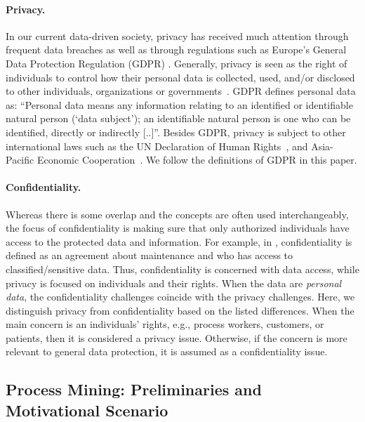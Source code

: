 \documentclass[manuscript]{acmart}
\begin{document}
\paragraph{Privacy.} In our current data-driven society, privacy has received much attention through frequent data breaches as well as through regulations such as Europe's General Data Protection Regulation (GDPR) \cite{GDPR}. Generally, privacy is seen as the right of individuals to control how their personal data is collected, used, and/or disclosed to other individuals, organizations or governments~\cite{westin1968privacy}.
GDPR defines personal data as: \enquote{Personal data means any information relating to an identified or identifiable natural person (\enquote{data subject}); an identifiable natural person is one who can be identified, directly or indirectly [..]}\cite{GDPR}. Besides GDPR, privacy is subject to other international laws such as the UN Declaration of Human Rights~\cite{UN}, and Asia-Pacific Economic Cooperation~\cite{APEC}. We follow the definitions of GDPR in this paper.
  
\paragraph{Confidentiality.} Whereas there is some overlap and the concepts are often used interchangeably, the focus of confidentiality is making sure that only authorized individuals have access to the protected data and information. For example, in \cite{harman2012electronic}, confidentiality is defined as an agreement about maintenance and who has access to classified/sensitive data. Thus, confidentiality is concerned with data access, while privacy is focused on individuals and their rights. When the data are \emph{personal data}, the confidentiality challenges coincide with the privacy challenges. Here, we distinguish privacy from confidentiality based on the listed differences. When the main concern is an individuals’ rights, e.g., process workers, customers, or patients, then it is considered a privacy issue. Otherwise, if the concern is more relevant to general data protection, it is assumed as a confidentiality issue. 

\subsection{Process Mining: Preliminaries and Motivational Scenario}
\label{scenarioA}
\end{document}
